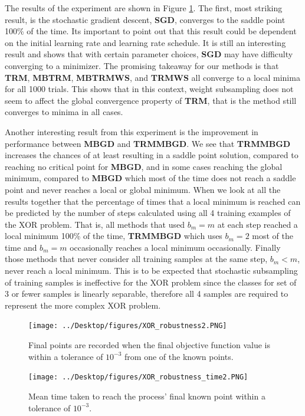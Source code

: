 \documentclass[letterpaper,12pt,titlepage,oneside,final]{book}
\begin{document}
	The results of the experiment are shown in Figure \ref{figure:XOR}. The first, most striking result, is the stochastic gradient descent, \textbf{SGD}, converges to the saddle point 100\% of the time. Its important to point out that this result could be dependent on the initial learning rate and learning rate schedule. It is still an interesting result and shows that with certain parameter choices, \textbf{SGD} may have difficulty converging to a minimizer. The promising takeaway for our methods is that \textbf{TRM}, \textbf{MBTRM}, \textbf{MBTRMWS}, and \textbf{TRMWS} all converge to a local minima for all 1000 trials. This shows that in this context, weight subsampling does not seem to affect the global convergence property of \textbf{TRM}, that is the method still converges to minima in all cases. 
	
	Another interesting result from this experiment is the improvement in performance between \textbf{MBGD} and \textbf{TRMMBGD}. We see that \textbf{TRMMBGD} increases the chances of at least resulting in a saddle point solution, compared to reaching no critical point for \textbf{MBGD}, and in some cases reaching the global minimum, compared to \textbf{MBGD} which most of the time does not reach a saddle point and never reaches a local or global minimum. When we look at all the results together that the percentage of times that a local minimum is reached can be predicted by the number of steps calculated using all 4 training examples of the XOR problem. That is, all methods that used $b_{m} = m$ at each step reached a local minimum 100\% of the time, \textbf{TRMMBGD} which uses $b_{m} = 2$ most of the time and $b_{m} = m$ occasionally reaches a local minimum occasionally. Finally those methods that never consider all training samples at the same step, $b_{m} < m$, never reach a local minimum. This is to be expected that stochastic subsampling of training samples is ineffective for the XOR problem since the classes for set of 3 or fewer samples is linearly separable, therefore all 4 samples are required to represent the more complex XOR problem.
	
	\begin{figure}[h]
		\centering
		\texttt{[image: ../Desktop/figures/XOR\_robustness2.PNG]}
		\caption{Final points are recorded when the final objective function value is within a tolerance of $10^{-3}$ from one of the known points.}
		\label{figure:XOR}
	\end{figure}
	
	\begin{figure}[h]
		\centering
		\texttt{[image: ../Desktop/figures/XOR\_robustness\_time2.PNG]}
		\caption{Mean time taken to reach the process' final known point within a tolerance of $10^{-3}$.}
		\label{figure:XOR_time}
	\end{figure}
	
\end{document}

